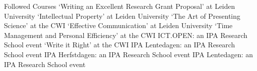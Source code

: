 
\begin{rubric}{Followed Courses}
		`Writing an Excellent Research Grant Proposal' at Leiden University
		`Intellectual Property' at Leiden University
		`The Art of Presenting Science' at the CWI
		`Effective Communication' at Leiden University
		`Time Management and Personal Efficiency' at the CWI
		ICT.OPEN: an IPA Research School event
		`Write it Right' at the CWI
		IPA Lentedagen: an IPA Research School event
		IPA Herfstdagen: an IPA Research School event
		IPA Lentedagen: an IPA Research School event
\end{rubric}
